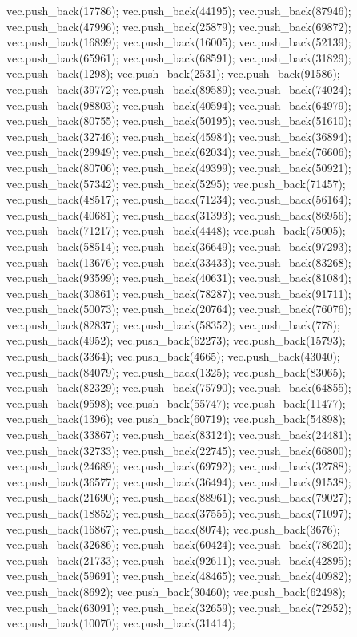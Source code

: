vec.push_back(17786);
vec.push_back(44195);
vec.push_back(87946);
vec.push_back(47996);
vec.push_back(25879);
vec.push_back(69872);
vec.push_back(16899);
vec.push_back(16005);
vec.push_back(52139);
vec.push_back(65961);
vec.push_back(68591);
vec.push_back(31829);
vec.push_back(1298);
vec.push_back(2531);
vec.push_back(91586);
vec.push_back(39772);
vec.push_back(89589);
vec.push_back(74024);
vec.push_back(98803);
vec.push_back(40594);
vec.push_back(64979);
vec.push_back(80755);
vec.push_back(50195);
vec.push_back(51610);
vec.push_back(32746);
vec.push_back(45984);
vec.push_back(36894);
vec.push_back(29949);
vec.push_back(62034);
vec.push_back(76606);
vec.push_back(80706);
vec.push_back(49399);
vec.push_back(50921);
vec.push_back(57342);
vec.push_back(5295);
vec.push_back(71457);
vec.push_back(48517);
vec.push_back(71234);
vec.push_back(56164);
vec.push_back(40681);
vec.push_back(31393);
vec.push_back(86956);
vec.push_back(71217);
vec.push_back(4448);
vec.push_back(75005);
vec.push_back(58514);
vec.push_back(36649);
vec.push_back(97293);
vec.push_back(13676);
vec.push_back(33433);
vec.push_back(83268);
vec.push_back(93599);
vec.push_back(40631);
vec.push_back(81084);
vec.push_back(30861);
vec.push_back(78287);
vec.push_back(91711);
vec.push_back(50073);
vec.push_back(20764);
vec.push_back(76076);
vec.push_back(82837);
vec.push_back(58352);
vec.push_back(778);
vec.push_back(4952);
vec.push_back(62273);
vec.push_back(15793);
vec.push_back(3364);
vec.push_back(4665);
vec.push_back(43040);
vec.push_back(84079);
vec.push_back(1325);
vec.push_back(83065);
vec.push_back(82329);
vec.push_back(75790);
vec.push_back(64855);
vec.push_back(9598);
vec.push_back(55747);
vec.push_back(11477);
vec.push_back(1396);
vec.push_back(60719);
vec.push_back(54898);
vec.push_back(33867);
vec.push_back(83124);
vec.push_back(24481);
vec.push_back(32733);
vec.push_back(22745);
vec.push_back(66800);
vec.push_back(24689);
vec.push_back(69792);
vec.push_back(32788);
vec.push_back(36577);
vec.push_back(36494);
vec.push_back(91538);
vec.push_back(21690);
vec.push_back(88961);
vec.push_back(79027);
vec.push_back(18852);
vec.push_back(37555);
vec.push_back(71097);
vec.push_back(16867);
vec.push_back(8074);
vec.push_back(3676);
vec.push_back(32686);
vec.push_back(60424);
vec.push_back(78620);
vec.push_back(21733);
vec.push_back(92611);
vec.push_back(42895);
vec.push_back(59691);
vec.push_back(48465);
vec.push_back(40982);
vec.push_back(8692);
vec.push_back(30460);
vec.push_back(62498);
vec.push_back(63091);
vec.push_back(32659);
vec.push_back(72952);
vec.push_back(10070);
vec.push_back(31414);

